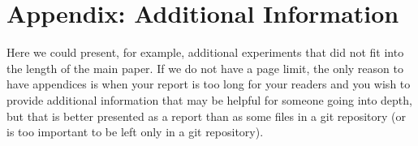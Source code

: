 \documentclass[a4paper,UKenglish,cleveref, autoref, thm-restate]{lipics-v2021}
\begin{document}
\section{Appendix: Additional Information}\label{app:correctness}

Here we could present, for example, additional experiments
that did not fit into the length of the main paper.  If we
do not have a page limit, the only reason to have appendices
is when your report is too long for your readers and you
wish to provide additional information that may be helpful
for someone going into depth, but that is better presented
as a report than as some files in a git repository (or is
too important to be left only in a git repository).
\end{document}
